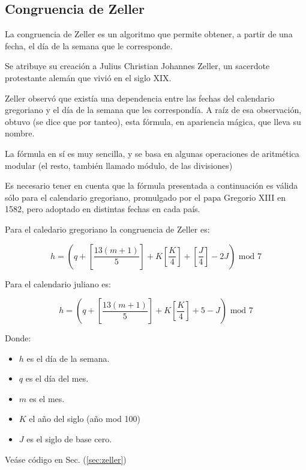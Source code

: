 \subsection{Congruencia de Zeller}

La congruencia de Zeller es un algoritmo que permite obtener, a partir de una
fecha, el día de la semana que le corresponde.

Se atribuye su creación a Julius Christian Johannes Zeller, un sacerdote
protestante alemán que vivió en el siglo XIX.

Zeller observó que existía una dependencia entre las fechas del calendario
gregoriano y el día de la semana que les correspondía. A raíz de esa
observación, obtuvo (se dice que por tanteo), esta fórmula, en apariencia
mágica, que lleva su nombre.

La fórmula en sí es muy sencilla, y se basa en algunas operaciones de aritmética
modular (el resto, también llamado módulo, de las divisiones)

Es necesario tener en cuenta que la fórmula presentada a continuación es válida
sólo para el calendario gregoriano, promulgado por el papa Gregorio XIII en
1582, pero adoptado en distintas fechas en cada país.

Para el caledario gregoriano la congruencia de Zeller es:

\begin{equation}
    h = (q + [\frac{13(m+1)}{5}] + K [\frac{K}{4}] + [\frac{J}{4}] - 2J ) \text{ mod } 7
\end{equation}

Para el calendario juliano es:

\begin{equation}
    h = (q + [\frac{13(m+1)}{5}] + K [\frac{K}{4}] + 5 - J ) \text{ mod } 7
\end{equation}

Donde:

\begin{itemize}
    \item $h$ es el día de la semana.
    \item $q$ es el día del mes.
    \item $m$ es el mes.
    \item $K$ el año del siglo (año mod 100)
    \item $J$ es el siglo de base cero.
\end{itemize}

Veáse código en Sec. (\ref{sec:zeller})
